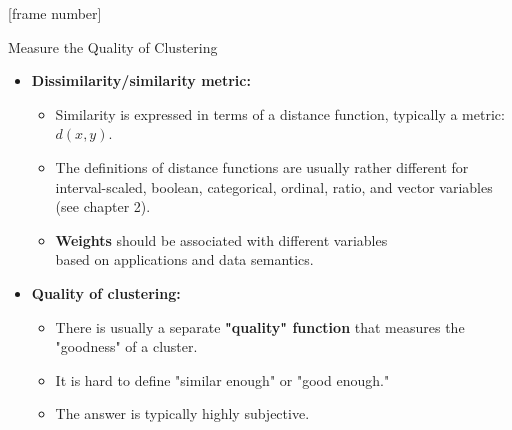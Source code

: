 \documentclass[aspectratio=169,t,xcolor=dvipsnames]{beamer}
\begin{document}
  {
    [frame number]
    \begin{frame}{Measure the Quality of Clustering}
        \begin{itemize}
          \item \textbf{Dissimilarity/similarity metric:}
          \begin{itemize}
            \item Similarity is expressed in terms of a distance function, typically a metric: $d(x,y)$.
            \item The definitions of distance functions are usually rather different for interval-scaled, boolean, categorical, ordinal, ratio, and vector variables (see chapter 2).
            \item \textbf{\color{airforceblue}Weights} should be associated with different variables \\
                  based on applications and data semantics.
          \end{itemize}
          \item \textbf{Quality of clustering:}
          \begin{itemize}
            \item There is usually a separate \textbf{\color{airforceblue}"quality" function} that measures the "goodness" of a cluster.
            \item It is hard to define "similar enough" or "good enough."
            \item The answer is typically highly subjective.
          \end{itemize}
        \end{itemize}
    \end{frame}
  }
\end{document}
